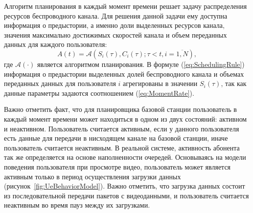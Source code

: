 Алгоритм планирования в каждый момент времени решает задачу распределения ресурсов беспроводного канала. Для решения данной задачи ему доступна информация о предыстории, а именно доли выделенных ресурсов канала, значения максимально достижимых скоростей канала и объем переданных данных для каждого пользователя:
\begin{equation}
A(t) = \mathcal{A}\left( S_i(\tau), C_i(\tau);\tau<t, i=\overline{1,N} \right),
\label{eq:SchedulingRule}
\end{equation}
где $\mathcal{A}\left(\cdot\right)$ является алгоритмом планирования. В формуле (\ref{eq:SchedulingRule}) информация о предыстории выделенных долей беспроводного канала и объемах переданных данных для пользователя $i$ агрегированы в значении $S_i(\tau)$, так как данные параметры задаются соотношением (\ref{eq:MomentRate}).

Важно отметить факт, что для планировщика базовой станции пользователь в каждый момент времени может находиться в одном из двух состояний: активном и неактивном. Пользователь считается активным, если у данного пользователя есть данные для передачи в нисходящем канале на базовой станции, иначе пользователь считается неактивным. В реальной системе, активность абонента так же определяется на основе наполненности очередей. Основываясь на модели поведения пользователя при просмотре видео, пользователь может является активным только в период осуществления загрузки данных (рисунок~\ref{fig:UeBehaviorModel}). Важно отметить, что загрузка данных состоит из последовательной передачи пакетов с видеоданными, и пользователь считается неактивным во время пауз между их загрузками.

